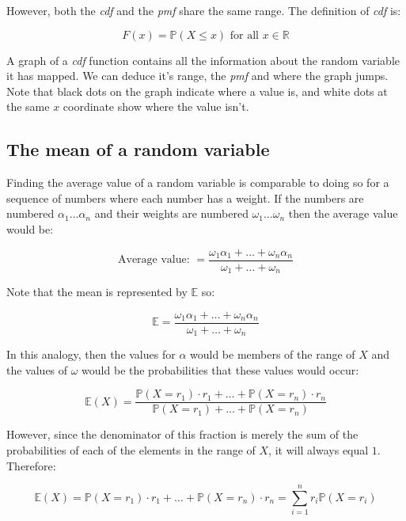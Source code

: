 However, both the {\it cdf} and the {\it pmf} share the same range. The
definition of {\it cdf} is:

\begin{dmath}
	{F(x) = \mathbb{P}(X \leq x)} \textrm{ for all $x \in \mathbb{R}$}
\end{dmath}

A graph of a {\it cdf} function contains all the information about the random
variable it has mapped. We can deduce it's range, the {\it pmf} and where the
graph jumps. Note that black dots on the graph indicate where a value is, and
white dots at the same $x$ coordinate show where the value isn't.

\subsection{The mean of a random variable}

Finding the average value of a random variable is comparable to doing so for a
sequence of numbers where each number has a weight. If the numbers are numbered
$\alpha_1 \dots \alpha_n$ and their weights are numbered $\omega_1 \dots
\omega_n$ then the average value would be:

\begin{dmath}
	\textrm{Average value: } = \frac{\omega_1\alpha_1 + \dots + \omega_n\alpha_n}{\omega_1 + \dots + \omega_n}
\end{dmath}

Note that the mean is represented by $\mathbb{E}$ so:

\begin{dmath}
	\mathbb{E} = \frac{\omega_1\alpha_1 + \dots + \omega_n\alpha_n}{\omega_1 + \dots + \omega_n}
\end{dmath}

In this analogy, then the values for $\alpha$ would be members of the range of
$X$ and the values of $\omega$ would be the probabilities that these values
would occur:

\begin{dmath}
	\mathbb{E}(X) = \frac{\mathbb{P}(X = r_1) \cdot r_1 + \dots + \mathbb{P}(X = r_n) \cdot r_n}{\mathbb{P}(X = r_1) + \dots + \mathbb{P}(X = r_n)}
\end{dmath}

However, since the denominator of this fraction is merely the sum of the
probabilities of each of the elements in the range of $X$, it will always equal
$1$. Therefore:

\begin{dmath}
	\mathbb{E}(X) = {\mathbb{P}(X = r_1) \cdot r_1 + \dots + \mathbb{P}(X = r_n) \cdot r_n} = {\sum\limits_{i=1}^{n} r_i \mathbb{P}(X = r_i)}
\end{dmath}

